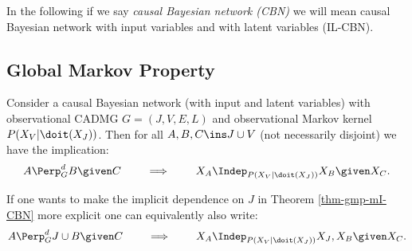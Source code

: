 \begin{Rem}
    In the following if we say \emph{causal Bayesian network (CBN)} we will mean 
    causal Bayesian network with input variables and with latent variables (IL-CBN).
\end{Rem}


\subsection{Global Markov Property}

\begin{Thm}
\label{thm-gmp-mI-CBN}
Consider a causal Bayesian network (with input and latent variables) with observational CADMG $G=(J,V,E,L)$ 
and observational Markov kernel $P(X_V|\doit(X_J))$.
Then for all $A, B, C \ins J \cup V$ (not necessarily disjoint) we have the implication:
\[ A \Perp^d_G B \given C \qquad \implies \qquad X_A \Indep_{P(X_V|\doit(X_J))} X_B \given X_C.   \]
\end{Thm}

\begin{Rem}
    If one wants to make the implicit dependence on $J$ in Theorem \ref{thm-gmp-mI-CBN} 
    more explicit one can equivalently also write:
\[ A \Perp^d_G J \cup B \given C \qquad \implies \qquad X_A \Indep_{P(X_V|\doit(X_J))} X_J,X_{B} \given X_C.   \]
\end{Rem}


